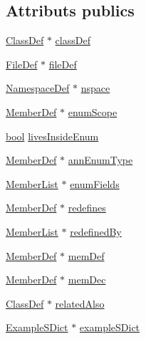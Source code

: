 \subsection*{Attributs publics}
\begin{DoxyCompactItemize}
\item 
\hyperlink{class_class_def}{Class\+Def} $\ast$ \hyperlink{class_member_def_impl_a5a878c3cebbd942f06d3aad51e0b4bf2}{class\+Def}
\item 
\hyperlink{class_file_def}{File\+Def} $\ast$ \hyperlink{class_member_def_impl_a9016f8962bb0cd2ac014000e9d572890}{file\+Def}
\item 
\hyperlink{class_namespace_def}{Namespace\+Def} $\ast$ \hyperlink{class_member_def_impl_a8e0dfb13f4f8065f64c6880f6bbbd637}{nspace}
\item 
\hyperlink{class_member_def}{Member\+Def} $\ast$ \hyperlink{class_member_def_impl_a4cc2fb7c5f8d7151c847d0f2a98389da}{enum\+Scope}
\item 
\hyperlink{qglobal_8h_a1062901a7428fdd9c7f180f5e01ea056}{bool} \hyperlink{class_member_def_impl_adfa50318923ace3b13233fbbcf5f1b62}{lives\+Inside\+Enum}
\item 
\hyperlink{class_member_def}{Member\+Def} $\ast$ \hyperlink{class_member_def_impl_ad4225c486c8f3f582a126e0fcc2b9f0f}{ann\+Enum\+Type}
\item 
\hyperlink{class_member_list}{Member\+List} $\ast$ \hyperlink{class_member_def_impl_a8b4c3dc3034475490bfed7c3fe539f44}{enum\+Fields}
\item 
\hyperlink{class_member_def}{Member\+Def} $\ast$ \hyperlink{class_member_def_impl_ad151683c284bc297e4469eab2a925565}{redefines}
\item 
\hyperlink{class_member_list}{Member\+List} $\ast$ \hyperlink{class_member_def_impl_a4c5e50d34df39faeb13f5d97f8996be0}{redefined\+By}
\item 
\hyperlink{class_member_def}{Member\+Def} $\ast$ \hyperlink{class_member_def_impl_aeacc0f8b9078f0108b27b70c0cdee781}{mem\+Def}
\item 
\hyperlink{class_member_def}{Member\+Def} $\ast$ \hyperlink{class_member_def_impl_a5b478eb79ba217c2eb129cb7136bfca9}{mem\+Dec}
\item 
\hyperlink{class_class_def}{Class\+Def} $\ast$ \hyperlink{class_member_def_impl_ae464a26ee9ffcb00fcb5bdc0536034b4}{related\+Also}
\item 
\hyperlink{class_example_s_dict}{Example\+S\+Dict} $\ast$ \hyperlink{class_member_def_impl_a03a0edb933f6b9c1c497be1494558849}{example\+S\+Dict}
\item 

\end{DoxyCompactItemize}
